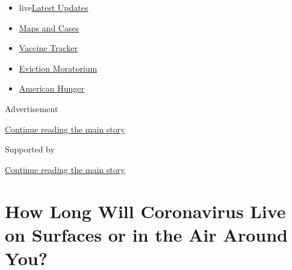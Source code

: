 \begin{itemize}
\tightlist
\item
  live\href{https://www.nytimes3xbfgragh.onion/2020/09/08/world/covid-19-coronavirus.html?name=styln-coronavirus-national\&region=TOP_BANNER\&block=storyline_menu_recirc\&action=click\&pgtype=Article\&impression_id=f906a360-f1c3-11ea-8fac-d5bd7dfae44a\&variant=undefined}{Latest
  Updates}
\item
  \href{https://www.nytimes3xbfgragh.onion/interactive/2020/us/coronavirus-us-cases.html?name=styln-coronavirus-national\&region=TOP_BANNER\&block=storyline_menu_recirc\&action=click\&pgtype=Article\&impression_id=f906a361-f1c3-11ea-8fac-d5bd7dfae44a\&variant=undefined}{Maps
  and Cases}
\item
  \href{https://www.nytimes3xbfgragh.onion/interactive/2020/science/coronavirus-vaccine-tracker.html?name=styln-coronavirus-national\&region=TOP_BANNER\&block=storyline_menu_recirc\&action=click\&pgtype=Article\&impression_id=f906a362-f1c3-11ea-8fac-d5bd7dfae44a\&variant=undefined}{Vaccine
  Tracker}
\item
  \href{https://www.nytimes3xbfgragh.onion/2020/09/02/your-money/eviction-moratorium-covid.html?name=styln-coronavirus-national\&region=TOP_BANNER\&block=storyline_menu_recirc\&action=click\&pgtype=Article\&impression_id=f906a363-f1c3-11ea-8fac-d5bd7dfae44a\&variant=undefined}{Eviction
  Moratorium}
\item
  \href{https://www.nytimes3xbfgragh.onion/interactive/2020/09/02/magazine/food-insecurity-hunger-us.html?name=styln-coronavirus-national\&region=TOP_BANNER\&block=storyline_menu_recirc\&action=click\&pgtype=Article\&impression_id=f906a364-f1c3-11ea-8fac-d5bd7dfae44a\&variant=undefined}{American
  Hunger}
\end{itemize}

Advertisement

\protect\hyperlink{after-top}{Continue reading the main story}

Supported by

\protect\hyperlink{after-sponsor}{Continue reading the main story}

\hypertarget{how-long-will-coronavirus-live-on-surfaces-or-in-the-air-around-you}{%
\section{How Long Will Coronavirus Live on Surfaces or in the Air Around
You?}\label{how-long-will-coronavirus-live-on-surfaces-or-in-the-air-around-you}}

